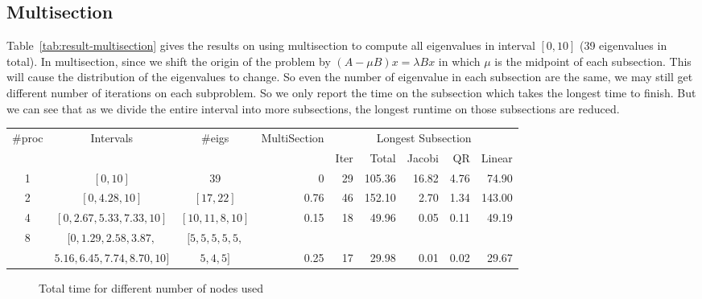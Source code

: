 \subsection{Multisection}
Table~\ref{tab:result-multisection} gives the results on using multisection to compute all eigenvalues in interval $[0, 10]$ (39 eigenvalues in total). In multisection, since we shift the origin of the problem by $(A - \mu B) x = \lambda B x$ in which $\mu$ is the midpoint of each subsection. This will cause the distribution of the eigenvalues to change. So even the number of eigenvalue in each subsection are the same, we may still get different number of iterations on each subproblem. So we only report the time on the subsection which takes the longest time to finish. But we can see that as we divide the entire interval into more subsections, the longest runtime on those subsections are reduced. 

\begin{table*}
\begin{center}
\begin{tabular}{|c | c | c | r | r | r | r | r | r |}
\hline
$\#$proc & Intervals & $\#$eigs & MultiSection & \multicolumn{5}{|c|}{Longest Subsection} \\
  & & &  & Iter & Total & Jacobi & QR & Linear \\
\hline
1 & $[0, 10]$ & 39 & 0 & 29 & 105.36 & 16.82 & 4.76 & 74.90 \\
2 & $[0, 4.28, 10]$ & $[17, 22]$ & 0.76 &  46 & 152.10 & 2.70 & 1.34 & 143.00\\
4 & $[0, 2.67, 5.33, 7.33, 10]$ & $[10, 11, 8, 10]$ & 0.15 & 18 & 49.96 & 0.05 & 0.11 & 49.19 \\
8 &$[0, 1.29, 2.58, 3.87, $ & $[5, 5, 5, 5, 5,$ & &  & & & & \\
& $5.16, 6.45, 7.74, 8.70, 10]$& $5, 4, 5]$& 0.25 & 17 & 29.98 & 0.01 & 0.02 & 29.67\\
\hline
\end{tabular}
\caption{Multisection result on $[0, 10]$ for the $10000 \times 10000$ generated matrix $A$ and $B$.}
\label{tab:result-multisection}
\end{center}
\end{table*}

\begin{figure}[htbp]
	\centering
	\caption{Total time for different number of nodes used}
  \label{fig:timenodes}
\end{figure}
